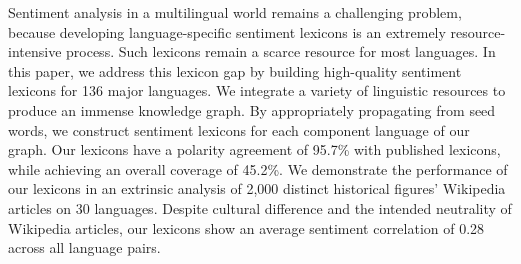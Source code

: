 Sentiment analysis in a multilingual world remains a challenging problem, because developing language-specific sentiment lexicons is an extremely resource-intensive process. Such lexicons remain a scarce resource for most languages. In this paper, we address this lexicon gap by building high-quality sentiment lexicons for 136 major languages. We integrate a variety of linguistic resources to produce an immense knowledge graph. By appropriately propagating from seed words, we construct sentiment lexicons for each component language of our graph. Our lexicons have a polarity agreement of 95.7\% with published lexicons, while achieving an overall coverage of 45.2\%. We demonstrate the performance of our lexicons in an extrinsic analysis of 2,000 distinct historical figures' Wikipedia articles on 30 languages. Despite cultural difference and the intended neutrality of Wikipedia articles, our lexicons show an average sentiment correlation of 0.28 across all language pairs.
